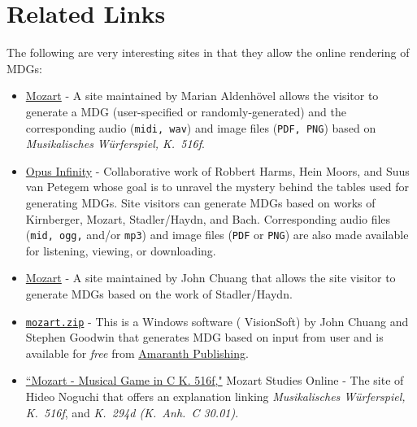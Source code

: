\documentclass[a4paper,x11names,svgnames,10pt]{article}
\begin{document}
\section{Related Links}
The following are very interesting sites in that they allow the online rendering of MDGs:
\begin{itemize}
	\item  \href{https://marian-aldenhoevel.de/mozart/}{Mozart} - A site maintained by Marian Aldenh\"{o}vel allows the visitor to generate a MDG (user-specified or randomly-generated) and the corresponding audio ({\tt midi, wav}) and image files ({\tt PDF, PNG}) based on {\em Musikalisches W\"{u}rferspiel, K.\ 516f}.
	
	\item \href{https://opus-infinity.org}{Opus Infinity} - Collaborative work of Robbert Harms, Hein Moors, and Suus van Petegem whose goal is to unravel the mystery behind the tables used for generating MDGs.  Site visitors can generate MDGs based on works of Kirnberger, Mozart, Stadler/Haydn, and Bach.  Corresponding audio files ({\tt mid, ogg,} and/or {\tt mp3}) and image files ({\tt PDF} or {\tt PNG}) are also made available for listening, viewing, or downloading.
	
	\item  \href{http://sunsite.univie.ac.at/Mozart/dice/}{Mozart} - A site maintained by John Chuang that allows the site visitor to generate MDGs based on the work of Stadler/Haydn.
 	
 	\item \href{https://www.amaranthpublishing.com/mozart.zip}{\tt mozart.zip} -  This is a Windows software ( VisionSoft) by John Chuang and Stephen Goodwin that generates MDG based on input from user and is available for {\it free} from  \href{http://www.amaranthpublishing.com/MozartDiceGame.htm}{Amaranth Publishing}.  
 	
 	\item \href{http://www.asahi-net.or.jp/\~rb5h-ngc/e/k516f.htm}{``Mozart - Musical Game in C K. 516f,"}	Mozart Studies Online - The site of Hideo Noguchi that offers an explanation linking {\em Musikalisches W\"{u}rferspiel, K.\ 516f}, and  {\em K.\ 294d (K.\ Anh.\ C 30.01)}. 
\end{itemize}
\end{document}
